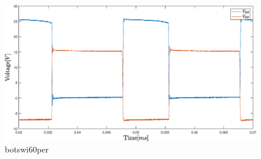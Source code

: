 \begin{figure}[H]
	\begin{center}
   \includegraphics[width=\textwidth]{figures/06Testing/botswi60per.eps}
	\end{center}
	\vspace{-8mm}
	\caption{botswi60per}
	\label{fig:V_OUT_ALL}
\end{figure}

